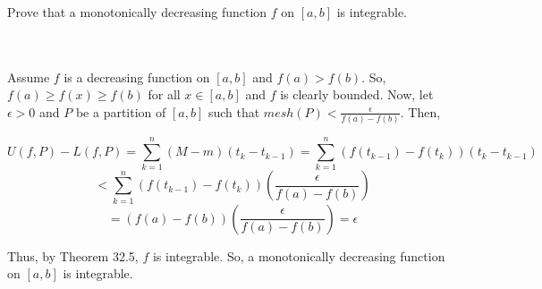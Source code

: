 Prove that a monotonically decreasing function $f$ on $[a,b]$ is integrable.\\\\

\begin{solution}\renewcommand{\qedsymbol}{}\ \\
    Assume $f$ is a decreasing function on $[a,b]$ and $f(a)>f(b)$. So, $f(a)\geq f(x)\geq f(b)$ for all
    $x\in[a,b]$ and $f$ is clearly bounded. Now, let $\epsilon>0$ and $P$ be a partition of $[a,b]$ such
    that $mesh(P)<\frac{\epsilon}{f(a)-f(b)}$. Then,
    
    $$U(f,P)-L(f,P)=\sum_{k=1}^n(M-m)(t_k-t_{k-1})=\sum_{k=1}^n(f(t_{k-1})-f(t_k))(t_k-t_{k-1})$$
    $$<\sum_{k=1}^n(f(t_{k-1})-f(t_k))(\frac{\epsilon}{f(a)-f(b)})$$
    $$=(f(a)-f(b))(\frac{\epsilon}{f(a)-f(b)})=\epsilon$$
    
    Thus, by Theorem 32.5, $f$ is integrable. So, a monotonically decreasing function on $[a,b]$ is
    integrable.

\end{solution}